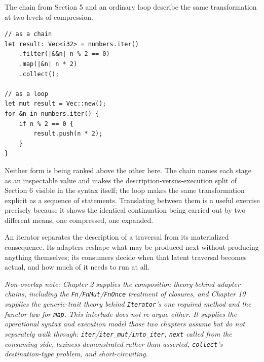 \documentclass[11pt]{book}
\begin{document}
The chain from Section 5 and an ordinary loop describe the same transformation at two levels of compression.

\begin{lstlisting}
// as a chain
let result: Vec<i32> = numbers.iter()
    .filter(|&&n| n % 2 == 0)
    .map(|&n| n * 2)
    .collect();

// as a loop
let mut result = Vec::new();
for &n in numbers.iter() {
    if n % 2 == 0 {
        result.push(n * 2);
    }
}
\end{lstlisting}

Neither form is being ranked above the other here. The chain names each stage as an inspectable value and makes the description-versus-execution split of Section 6 visible in the syntax itself; the loop makes the same transformation explicit as a sequence of statements. Translating between them is a useful exercise precisely because it shows the identical continuation being carried out by two different means, one compressed, one expanded.

\begin{invariantbox}
An iterator separates the description of a traversal from its materialized consequence. Its adapters reshape what may be produced next without producing anything themselves; its consumers decide when that latent traversal becomes actual, and how much of it needs to run at all.
\end{invariantbox}

\bigskip
\noindent\textit{Non-overlap note: Chapter 2 supplies the composition theory behind adapter chains, including the \texttt{Fn}/\texttt{FnMut}/\texttt{FnOnce} treatment of closures, and Chapter 10 supplies the generic-trait theory behind \texttt{Iterator}'s one required method and the functor law for \texttt{map}. This interlude does not re-argue either. It supplies the operational syntax and execution model those two chapters assume but do not separately walk through: \texttt{iter}/\texttt{iter\_mut}/\texttt{into\_iter}, \texttt{next} called from the consuming side, laziness demonstrated rather than asserted, \texttt{collect}'s destination-type problem, and short-circuiting.}
\end{document}
